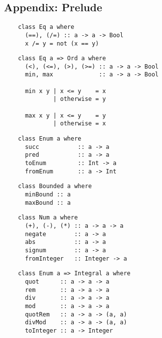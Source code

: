 


\begin{multicols}{2}\footnotesize 
	
	\section*{Appendix: Prelude}
	
	\begin{verbatim}
	class Eq a where
	  (==), (/=) :: a -> a -> Bool
	  x /= y = not (x == y)
	\end{verbatim}
	
	\begin{verbatim}
	class Eq a => Ord a where
	  (<), (<=), (>), (>=) :: a -> a -> Bool
	  min, max             :: a -> a -> Bool
	
	  min x y | x <= y    = x
	          | otherwise = y
	
	  max x y | x <= y    = y
	          | otherwise = x
	\end{verbatim}
	
	\begin{verbatim}
	class Enum a where
	  succ           :: a -> a 
	  pred           :: a -> a
	  toEnum         :: Int -> a
	  fromEnum       :: a -> Int 
	\end{verbatim}
	
	\begin{verbatim}
	class Bounded a where
	  minBound :: a 
	  maxBound :: a
	\end{verbatim}
	
	\begin{verbatim}
	class Num a where 
	  (+), (-), (*) :: a -> a -> a
	  negate        :: a -> a
	  abs           :: a -> a
	  signum        :: a -> a
	  fromInteger   :: Integer -> a
	\end{verbatim}
	
	\begin{verbatim}
	class Enum a => Integral a where 
	  quot      :: a -> a -> a
	  rem       :: a -> a -> a
	  div       :: a -> a -> a
	  mod       :: a -> a -> a
	  quotRem   :: a -> a -> (a, a)
	  divMod    :: a -> a -> (a, a)
	  toInteger :: a -> Integer
	\end{verbatim}
	

\end{multicols}
